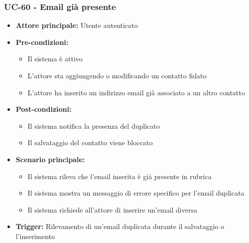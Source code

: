 \documentclass[a4paper,12pt]{article}
\begin{document}
\subsubsection{UC-60 - Email già presente} \label{subsec:UC-60}
\begin{itemize}
    \item \textbf{Attore principale:} Utente autenticato
    \item \textbf{Pre-condizioni:}
    \begin{itemize}
        \item Il sistema è attivo
        \item L'attore sta aggiungendo o modificando un contatto fidato
        \item L'attore ha inserito un indirizzo email già associato a un altro contatto
    \end{itemize}
    \item \textbf{Post-condizioni:}
    \begin{itemize}
        \item Il sistema notifica la presenza del duplicato
        \item Il salvataggio del contatto viene bloccato
    \end{itemize}
    \item \textbf{Scenario principale:}
    \begin{itemize}
        \item Il sistema rileva che l'email inserita è già presente in rubrica
        \item Il sistema mostra un messaggio di errore specifico per l'email duplicata
        \item Il sistema richiede all'attore di inserire un'email diversa
    \end{itemize}
    \item \textbf{Trigger:} Rilevamento di un'email duplicata durante il salvataggio o l'inserimento
\end{itemize}
\end{document}
